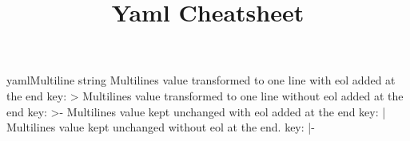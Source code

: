 \documentclass[10pt,a4paper]{article}
\title{\color{w3schools}Yaml Cheatsheet
}
\begin{document}
\maketitle

\small
\begin{multicols}{3}

\thispagestyle{empty}
\scriptsize



\begin{codebox}{yaml}{Multiline string}
Multilines value transformed to one line with eol added at the end
key: >
Multilines value transformed to one line without eol added at the end
key: >-
Multilines value kept unchanged with eol added at the end
key: |
Multilines value kept unchanged without eol at the end.
key: |-

\end{codebox}


\AtNextBibliography{\footnotesize}
\printbibliography  
\end{multicols}
\end{document}
